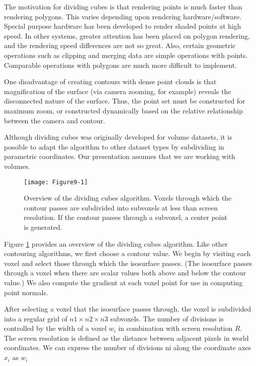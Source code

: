 The motivation for dividing cubes is that rendering points is much faster than rendering polygons. This varies depending upon rendering hardware/software. Special purpose hardware has been developed to render shaded points at high speed. In other systems, greater attention has been placed on polygon rendering, and the rendering speed differences are not so great. Also, certain geometric operations such as clipping and merging data are simple operations with points. Comparable operations with polygons are much more difficult to implement.

One disadvantage of creating contours with dense point clouds is that magnification of the surface (via camera zooming, for example) reveals the disconnected nature of the surface. Thus, the point set must be constructed for maximum zoom, or constructed dynamically based on the relative relationship between the camera and contour.

Although dividing cubes was originally developed for volume datasets, it is possible to adapt the algorithm to other dataset types by subdividing in parametric coordinates. Our presentation assumes that we are working with volumes.

\begin{figure}[!htb]
    \centering
    \texttt{[image: Figure9-1]}\\
    \caption{Overview of the dividing cubes algorithm. Voxels through which the contour passes are subdivided into subvoxels at less than screen resolution. If the contour passes through a subvoxel, a center point is generated.}\label{fig:Figure9-1}
\end{figure}

Figure \ref{fig:Figure9-1} provides an overview of the dividing cubes algorithm. Like other contouring algorithms, we first choose a contour value. We begin by visiting each voxel and select those through which the isosurface passes. (The isosurface passes through a voxel when there are scalar values both above and below the contour value.) We also compute the gradient at each voxel point for use in computing point normals.

After selecting a voxel that the isosurface passes through, the voxel is subdivided into a regular grid of $n1 \times n2 \times n3$ subvoxels. The number of divisions is controlled by the width of a voxel $w_i$ in combination with screen resolution $R$. The screen resolution is defined as the distance between adjacent pixels in world coordinates. We can express the number of divisions ni along the coordinate axes $x_i$ as $w_i$

